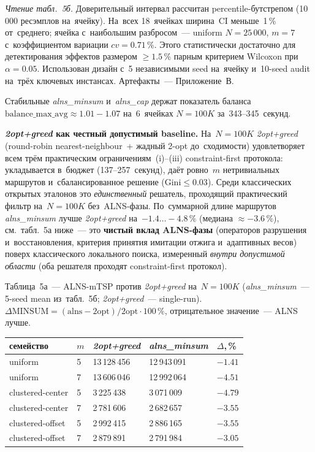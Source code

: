 \documentclass[a4paper,14pt]{extreport}
\begin{document}
\medskip
\noindent\textit{Чтение табл.~5б.} Доверительный интервал рассчитан percentile-бутстрепом (10\,000 ресэмплов на~ячейку). На~всех 18~ячейках ширина~CI меньше~1\,\% от~среднего; ячейка с~наибольшим разбросом~--- uniform $N=25\,000$, $m=7$ с~коэффициентом вариации $cv=0.71\,\%$. Этого статистически достаточно для детектирования эффектов размером $\geq 1.5\,\%$ парным критерием Wilcoxon при~$\alpha=0.05$. Использован дизайн с~5 независимыми seed на~ячейку и~10-seed audit на~трёх ключевых инстансах. Артефакты~--- Приложение~В.

Стабильные \emph{alns\_minsum} и~\emph{alns\_cap} держат показатель баланса $\mathrm{balance\_max\_avg}\approx 1.01{-}1.07$ на~6~ячейках $N=100K$ за~343--345~секунд.

\medskip
\textbf{\emph{2opt+greed} как честный допустимый baseline.} На~$N=100K$ \emph{2opt+greed} (round-robin nearest-neighbour~+ жадный 2-opt до~сходимости) удовлетворяет всем трём практическим ограничениям~(i)--(iii) constraint-first протокола: укладывается в~бюджет (137--257~секунд), даёт ровно~$m$ нетривиальных маршрутов и~сбалансированное решение ($\mathrm{Gini}\leq 0.03$). Среди классических открытых эталонов это \emph{единственный} решатель, проходящий практический фильтр на~$N=100K$ без~ALNS-фазы. По~суммарной длине маршрутов \emph{alns\_minsum} лучше \emph{2opt+greed} на~$-1.4\dots-4.8\,\%$ (медиана $\approx -3.6\,\%$), см.~табл.~5а ниже~--- это \textbf{чистый вклад ALNS-фазы} (операторов разрушения и~восстановления, критерия принятия имитации отжига и~адаптивных весов) поверх классического локального поиска, измеренный \emph{внутри допустимой области} (оба решателя проходят constraint-first протокол).

\medskip
\noindent Таблица~5а~--- ALNS-mTSP против \emph{2opt+greed} на~$N=100K$ (\emph{alns\_minsum}~--- 5-seed mean из~табл.~5б; \emph{2opt+greed}~--- single-run). $\Delta\mathrm{MINSUM}=(\mathrm{alns}-\mathrm{2opt})/\mathrm{2opt}\cdot 100\,\%$, отрицательное значение~--- ALNS лучше.

\begin{center}\small
\setlength{\tabcolsep}{5pt}
\begin{tabular}{|L{3.2cm}|C{0.6cm}|R{1.9cm}|R{1.9cm}|R{1.1cm}|}
\hline
\textbf{семейство} & $m$ & \textbf{\emph{2opt+greed}} & \textbf{\emph{alns\_minsum}} & \textbf{$\Delta$,\,\%} \\
\hline
uniform              & 5 & 13\,128\,456 & 12\,943\,091 & $-1.41$ \\
\hline
uniform              & 7 & 13\,606\,046 & 12\,992\,064 & $-4.51$ \\
\hline
clustered-center     & 5 & 3\,225\,438  & 3\,071\,009  & $-4.79$ \\
\hline
clustered-center     & 7 & 2\,781\,606  & 2\,682\,657  & $-3.55$ \\
\hline
clustered-offset     & 5 & 2\,992\,415  & 2\,886\,165  & $-3.55$ \\
\hline
clustered-offset     & 7 & 2\,879\,891  & 2\,791\,984  & $-3.05$ \\
\hline
\end{tabular}
\end{center}
\end{document}

